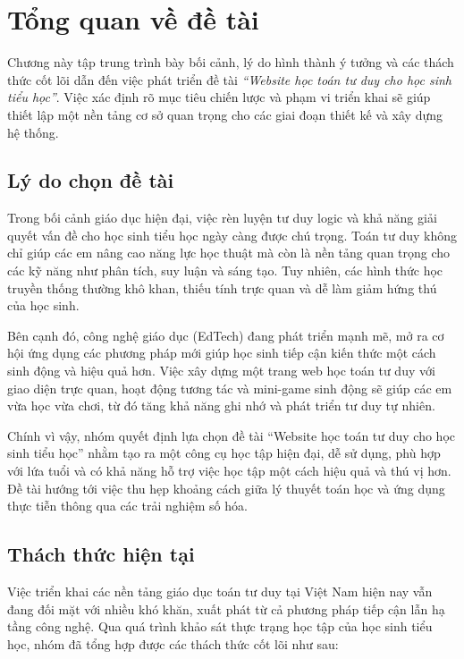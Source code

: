 \section{Tổng quan về đề tài}

Chương này tập trung trình bày bối cảnh, lý do hình thành ý tưởng và các thách thức cốt lõi dẫn đến việc phát triển đề tài \textit{“Website học toán tư duy cho học sinh tiểu học”}. Việc xác định rõ mục tiêu chiến lược và phạm vi triển khai sẽ giúp thiết lập một nền tảng cơ sở quan trọng cho các giai đoạn thiết kế và xây dựng hệ thống.

\subsection{Lý do chọn đề tài}

Trong bối cảnh giáo dục hiện đại, việc rèn luyện tư duy logic và khả năng giải quyết vấn đề cho học sinh tiểu học ngày càng được chú trọng. Toán tư duy không chỉ giúp các em nâng cao năng lực học thuật mà còn là nền tảng quan trọng cho các kỹ năng như phân tích, suy luận và sáng tạo. Tuy nhiên, các hình thức học truyền thống thường khô khan, thiếu tính trực quan và dễ làm giảm hứng thú của học sinh.

Bên cạnh đó, công nghệ giáo dục (EdTech) đang phát triển mạnh mẽ, mở ra cơ hội ứng dụng các phương pháp mới giúp học sinh tiếp cận kiến thức một cách sinh động và hiệu quả hơn. Việc xây dựng một trang web học toán tư duy với giao diện trực quan, hoạt động tương tác và mini-game sinh động sẽ giúp các em vừa học vừa chơi, từ đó tăng khả năng ghi nhớ và phát triển tư duy tự nhiên.

Chính vì vậy, nhóm quyết định lựa chọn đề tài “Website học toán tư duy cho học sinh tiểu học” nhằm tạo ra một công cụ học tập hiện đại, dễ sử dụng, phù hợp với lứa tuổi và có khả năng hỗ trợ việc học tập một cách hiệu quả và thú vị hơn. Đề tài hướng tới việc thu hẹp khoảng cách giữa lý thuyết toán học và ứng dụng thực tiễn thông qua các trải nghiệm số hóa.

\subsection{Thách thức hiện tại}

Việc triển khai các nền tảng giáo dục toán tư duy tại Việt Nam hiện nay vẫn đang đối mặt với nhiều khó khăn, xuất phát từ cả phương pháp tiếp cận lẫn hạ tầng công nghệ. Qua quá trình khảo sát thực trạng học tập của học sinh tiểu học, nhóm đã tổng hợp được các thách thức cốt lõi như sau:

